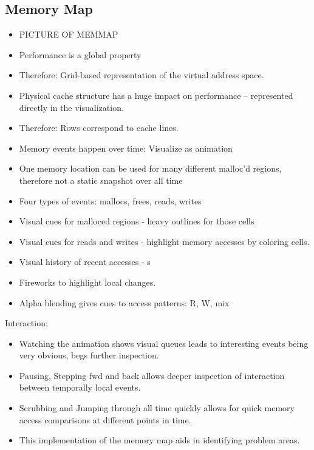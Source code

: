 \documentclass[annual]{acmsiggraph}
\begin{document}
  \subsection{Memory Map}
    \begin{itemize}
      \item PICTURE OF MEMMAP
      \item Performance is a global property 
      \item Therefore: Grid-based representation of the virtual address space.
      \item Physical cache structure has a huge impact on performance -- represented directly in the visualization.    
      \item Therefore: Rows correspond to cache lines.
      \item Memory events happen over time: Visualize as animation
      \item One memory location can be used for many different malloc'd regions, therefore not a static snapshot over all time
      \item Four types of events: mallocs, frees, reads, writes
      \item Visual cues for malloced regions - heavy outlines for those cells
      \item Visual cues for reads and writes - highlight memory accesses by coloring cells.
      \item Visual history of recent accesses - s
      \item Fireworks to highlight local changes.
      \item Alpha blending gives cues to access patterns: R, W, mix
   \end{itemize}

Interaction:
   \begin{itemize}   
      \item Watching the animation shows visual queues leads to interesting events being very obvious, begs further inspection.
      \item Pausing, Stepping fwd and back allows deeper inspection of interaction between temporally local events.
      \item Scrubbing and Jumping through all time quickly allows for quick memory access comparisons at different points in time.
      \item This implementation of the memory map aids in identifying problem areas.
    \end{itemize}
  
\end{document}

